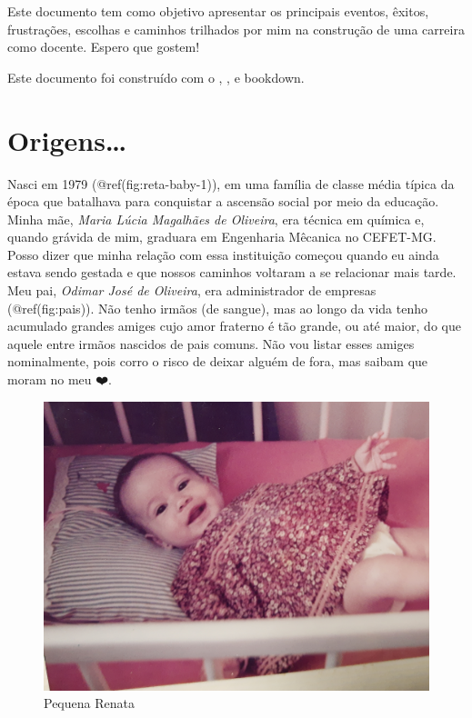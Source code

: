 \documentclass[
]{book}
\begin{document}
Este documento tem como objetivo apresentar os principais eventos,
êxitos, frustrações, escolhas e caminhos trilhados por mim na construção
de uma carreira como docente. Espero que gostem!

Este documento foi construído com o , , e bookdown.

\hypertarget{origens}{%
\chapter{Origens\ldots{}}\label{origens}}

Nasci em 1979 (@ref(fig:reta-baby-1)), em uma família de classe média
típica da época que batalhava para conquistar a ascensão social por meio
da educação. Minha mãe, \emph{Maria Lúcia Magalhães de Oliveira}, era
técnica em química e, quando grávida de mim, graduara em Engenharia
Mêcanica no CEFET-MG. Posso dizer que minha relação com essa instituição
começou quando eu ainda estava sendo gestada e que nossos caminhos
voltaram a se relacionar mais tarde. Meu pai, \emph{Odimar José de
Oliveira}, era administrador de empresas (@ref(fig:pais)). Não tenho
irmãos (de sangue), mas ao longo da vida tenho acumulado grandes amiges
cujo amor fraterno é tão grande, ou até maior, do que aquele entre
irmãos nascidos de pais comuns. Não vou listar esses amiges
nominalmente, pois corro o risco de deixar alguém de fora, mas saibam
que moram no meu ❤️.

\begin{figure}
\centering
\includegraphics{img/reta_baby_1.jpg}
\caption{Pequena Renata}
\end{figure}
\end{document}
